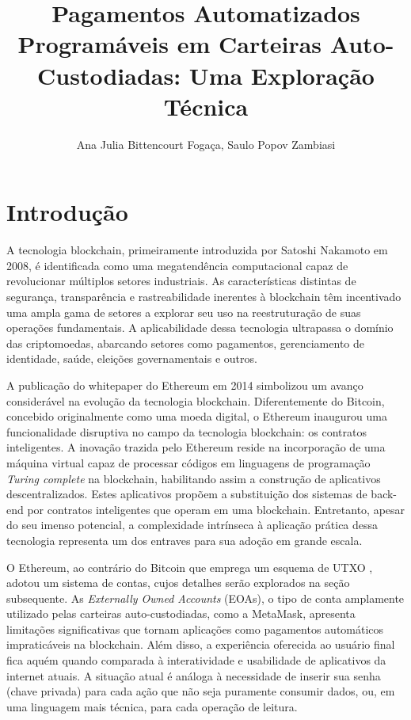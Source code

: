 \documentclass[12pt]{article}
\title{Pagamentos Automatizados Programáveis em Carteiras Auto-Custodiadas: Uma Exploração Técnica}
\author{Ana Julia Bittencourt Fogaça\inst{1}, Saulo Popov Zambiasi\inst{2} }
\begin{document}
\maketitle

\begin{abstract}
\end{abstract}

\section{Introdução}
A tecnologia blockchain, primeiramente introduzida por Satoshi Nakamoto em 2008, é identificada
como uma megatendência computacional capaz de revolucionar múltiplos setores industriais\cite{1}.
As características distintas de segurança, transparência e rastreabilidade inerentes à blockchain
têm incentivado uma ampla gama de setores a explorar seu uso na reestruturação de suas operações
fundamentais. A aplicabilidade dessa tecnologia ultrapassa o domínio das criptomoedas, abarcando
setores como pagamentos, gerenciamento de identidade, saúde, eleições governamentais e
outros\cite{2}.

A publicação do whitepaper do Ethereum em 2014 simbolizou um avanço considerável na evolução da
tecnologia blockchain\cite{3}. Diferentemente do Bitcoin, concebido originalmente como uma moeda
digital, o Ethereum inaugurou uma funcionalidade disruptiva no campo da tecnologia blockchain: os
contratos inteligentes. A inovação trazida pelo Ethereum reside na incorporação de uma máquina
virtual capaz de processar códigos em linguagens de programação \textit{Turing complete} na
blockchain, habilitando assim a construção de aplicativos descentralizados. Estes aplicativos
propõem a substituição dos sistemas de back-end por contratos inteligentes que operam em uma
blockchain\cite{7}. Entretanto, apesar do seu imenso potencial, a complexidade intrínseca à
aplicação prática dessa tecnologia representa um dos entraves para sua adoção em grande
escala\cite{11}.

O Ethereum, ao contrário do Bitcoin que emprega um esquema de UTXO \cite{20}, adotou um sistema de
contas, cujos detalhes serão explorados na seção subsequente. As \textit{Externally Owned Accounts}
(EOAs), o tipo de conta amplamente utilizado pelas carteiras auto-custodiadas, como a
MetaMask\cite{21}, apresenta limitações significativas que tornam aplicações como pagamentos
automáticos impraticáveis na blockchain. Além disso, a experiência oferecida ao usuário final fica
aquém quando comparada à interatividade e usabilidade de aplicativos da internet atuais. A situação
atual é análoga à necessidade de inserir sua senha (chave privada) para cada ação que não seja
puramente consumir dados, ou, em uma linguagem mais técnica, para cada operação de leitura.
\end{document}
